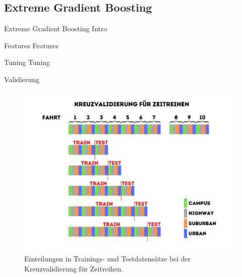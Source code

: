 \subsection{Extreme Gradient Boosting}

\begin{frame}{Extreme Gradient Boosting}
    Intro
\end{frame}

\begin{frame}{Features}
    Features
\end{frame}

\begin{frame}{Tuning}
    Tuning
\end{frame}

\begin{frame}{Validierung}
	\begin{figure}[h]
		\centering
		\includegraphics[scale=0.33]{kreuzvalidierung}
		\caption{Einteilungen in Trainings- und Testdatensätze bei der Kreuzvalidierung für Zeitreihen.}
		\label{kreuzvalidierung}
	\end{figure}
\end{frame}

